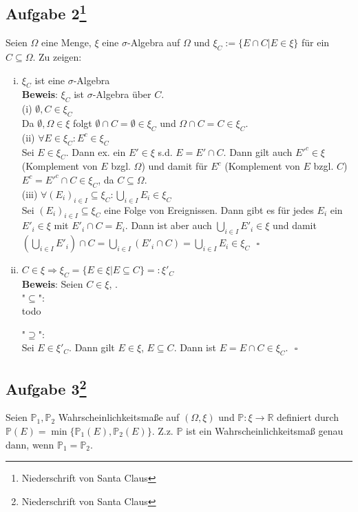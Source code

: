 \documentclass[11pt,a4paper,ngerman]{article}
\newcommand{\set}[1]{ \{ #1 \}}
\newcommand{\Prob}{\mathbb{P}}
\begin{document}
\subsection*{Aufgabe 2\footnote{Niederschrift von Santa Claus}}
Seien $\Omega$ eine Menge, $\xi$ eine $\sigma$-Algebra auf $\Omega$ und $\xi_C := \set{E \cap C | E \in \xi}$ für ein $C \subseteq \Omega$.
Zu zeigen:
\begin{enumerate}[(i)]
\item $\xi_C$ ist eine $\sigma$-Algebra \\
\textbf{Beweis}: $\xi_C$ ist $\sigma$-Algebra über $C$. \\
(i) $\emptyset ,C \in \xi_C$ \\
Da $\emptyset, \Omega \in \xi$ folgt $\emptyset \cap C = \emptyset \in \xi_C$ und $\Omega \cap C = C \in \xi_C$.\\
(ii) $\forall E \in \xi_C: E^c \in \xi_C$ \\
Sei $E \in \xi_C$. Dann ex. ein $E' \in \xi$ s.d. $E = E' \cap C$. Dann gilt auch $E'^c \in \xi$ (Komplement von $E$ bzgl. $\Omega$) und damit für 
$E^c$ (Komplement von $E$ bzgl. $C$) $E^c = E'^c \cap C \in \xi_C$, da $C \subseteq \Omega$. \\
(iii) $\forall \left(E_i\right)_{i \in I} \subseteq \xi_C: \bigcup_{i \in I} {E_i} \in \xi_C$  \\
Sei $\left(E_i\right)_{i \in I} \subseteq \xi_C$ eine Folge von Ereignissen. Dann gibt es für jedes $E_i$ ein $E'_i \in \xi$ mit $E'_i \cap C = E_i$.
Dann ist aber auch $\bigcup_{i \in I} E'_i \in \xi$ und damit $\left( \bigcup_{i \in I} E'_i \right) \cap C = \bigcup_{i \in I} \left( E'_i \cap C \right) = \bigcup_{i \in I} E_i \in \xi_C$
$\mbox{}$ \hfill $\square$
\item $C \in \xi \Rightarrow \xi_C = \set{E \in \xi | E \subseteq C} =: \xi'_C$ \\
\textbf{Beweis}: Seien $C \in \xi$, .\\
"$\subseteq$": \\
todo

"$\supseteq$": \\
Sei $E \in \xi'_C$. Dann gilt $E \in \xi$, $E \subseteq C$. Dann ist $E = E \cap C \in \xi_C$.
$\mbox{}$ \hfill $\square$
\end{enumerate}


\subsection*{Aufgabe 3\footnote{Niederschrift von Santa Claus}}
Seien $\Prob_1, \Prob_2$ Wahrscheinlichkeitsmaße auf $(\Omega, \xi)$ und $\Prob: \xi \to \mathbb{R}$ definiert durch $\Prob(E) = \min \set{\Prob_1(E), \Prob_2(E)}$. Z.z. $\Prob$ ist ein Wahrscheinlichkeitsmaß genau dann, wenn $\Prob_1 = \Prob_2$.
\end{document}
